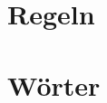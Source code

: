 \documentclass{report}
\begin{document}
\tableofcontents



\chapter{Regeln}




\chapter{W\"orter}









\end{document}

